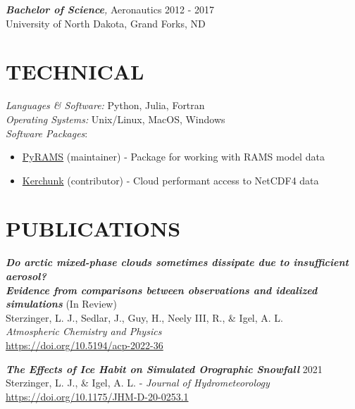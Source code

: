 \documentclass[overlapped]{res}
\begin{document}
\begin{resume}
                {\sl \textbf{Bachelor of Science},} Aeronautics 
                \hfill 2012 - 2017 \\
                University of North Dakota, Grand Forks, ND

\section{TECHNICAL} 
                {\sl Languages \& Software:} Python, Julia, Fortran \\
                {\sl Operating Systems:} Unix/Linux, MacOS, Windows\\
                {\sl Software Packages}:
                    \begin{itemize}
                        \item \href{https://github.com/lsterzinger/pyrams}{PyRAMS} (maintainer) - Package for working with RAMS model data
                        \item \href{https://github.com/fsspec/kerchunk}{Kerchunk} (contributor) - Cloud performant access to NetCDF4 data
                    \end{itemize}
                
                    \section{PUBLICATIONS}

                    {\sl \textbf{Do arctic mixed-phase clouds sometimes dissipate due to insufficient aerosol?\\Evidence from comparisons between observations and idealized simulations}}
                    \hfill (In Review) \\ Sterzinger, L. J., Sedlar, J., Guy, H., Neely III, R., \& Igel, A. L. \\ \textit{Atmospheric Chemistry and Physics} \\ \href{https://doi.org/10.5194/acp-2022-36}{https://doi.org/10.5194/acp-2022-36}
    
                    {\sl \textbf{The Effects of Ice Habit on Simulated Orographic Snowfall}} 
                    \hfill 2021 \\ Sterzinger, L. J., \& Igel, A. L. - \textit{Journal of Hydrometeorology} \\ \href{https://doi.org/10.1175/JHM-D-20-0253.1}{https://doi.org/10.1175/JHM-D-20-0253.1}
    
    

\end{resume}
\end{document}
